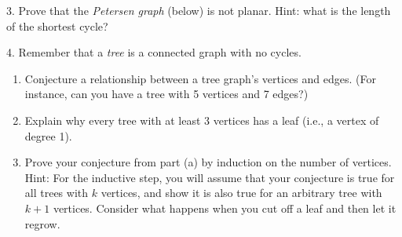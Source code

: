 \documentclass[10pt,]{book}
\theoremstyle{plain}
\theoremstyle{definition}
\theoremstyle{definition}
\theoremstyle{definition}
\numberwithin{equation}{chapter}
\newcommand{\vtx}[2]{node[fill,circle,inner sep=0pt, minimum size=4pt,label=#1:#2]{}}
\renewcommand{\v}{\vtx{above}{}}
\begin{document}
\begin{exerciselist}
\begin{enumerate}[label=(\alph*)]
\end{enumerate}
\par\smallskip
\item[3.]\hypertarget{exercise-315}{}
            Prove that the \emph{Petersen graph} (below) is not planar. Hint: what is the length of the shortest cycle?
\leavevmode%
\begin{figure}
\centering
{
}
\end{figure}
\par\smallskip
\item[4.]\hypertarget{exercise-316}{}
            Remember that a \emph{tree} is a connected graph with no cycles.
\leavevmode%
\begin{enumerate}[label=(\alph*)]
\item\hypertarget{li-1303}{}
                Conjecture a relationship between a tree graph's vertices and edges. (For instance, can you have a tree with 5 vertices and 7 edges?)


\item\hypertarget{li-1304}{}
                Explain why every tree with at least 3 vertices has a leaf (i.e., a vertex of degree 1).


\item\hypertarget{li-1305}{}
                Prove your conjecture from part (a) by induction on the number of vertices. Hint: For the inductive step, you will assume that your conjecture is true for all trees with \(k\) vertices, and show it is also true for an arbitrary tree with \(k+1\) vertices. Consider what happens when you cut off a leaf and then let it regrow.



\end{enumerate}
\end{exerciselist}
\end{document}
